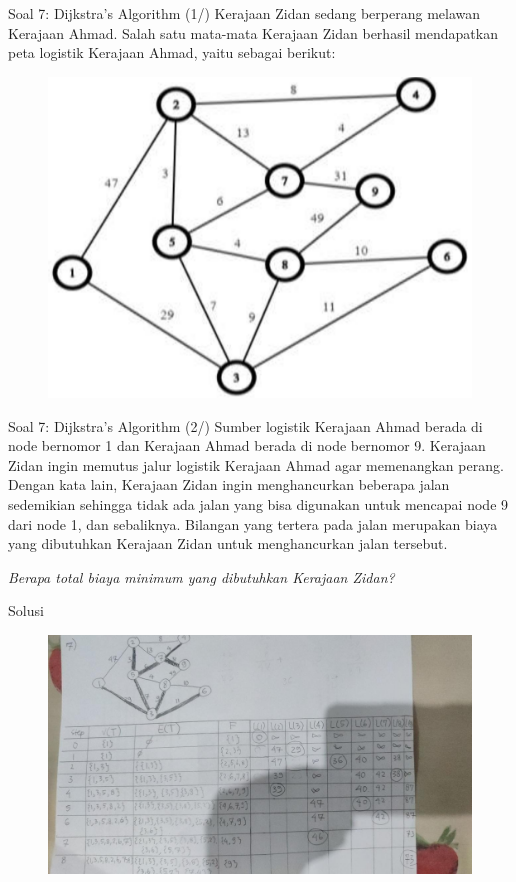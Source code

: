 \documentclass[english,t]{beamer}
\begin{document}
\begin{frame}{Soal 7: Dijkstra's Algorithm (1/)} 
Kerajaan Zidan sedang berperang melawan Kerajaan Ahmad. Salah satu mata-mata Kerajaan Zidan berhasil mendapatkan peta logistik Kerajaan Ahmad, yaitu sebagai berikut:
\begin{figure}[!ht]
	\centering
	\includegraphics[scale=.225]{images/soal-7-peta}
\end{figure}
\end{frame}

\begin{frame}{Soal 7: Dijkstra's Algorithm (2/)} 
Sumber logistik Kerajaan Ahmad berada di node bernomor 1 dan Kerajaan Ahmad berada di node bernomor 9. Kerajaan Zidan ingin memutus jalur logistik Kerajaan Ahmad agar memenangkan perang. Dengan kata lain, Kerajaan Zidan ingin menghancurkan beberapa jalan sedemikian sehingga tidak ada jalan yang bisa digunakan untuk mencapai node 9 dari node 1, dan sebaliknya. Bilangan yang tertera pada jalan merupakan biaya yang dibutuhkan Kerajaan Zidan untuk menghancurkan jalan tersebut. 

\bigskip
\textit{Berapa total biaya minimum yang dibutuhkan Kerajaan Zidan?}
\end{frame}

\begin{frame}{Solusi~\citep{epp2020discrete}}
\begin{figure}[!ht]
	\centering
	\includegraphics[scale=.275]{images/solusi-soal-7}
\end{figure}
\end{frame}
\end{document}
